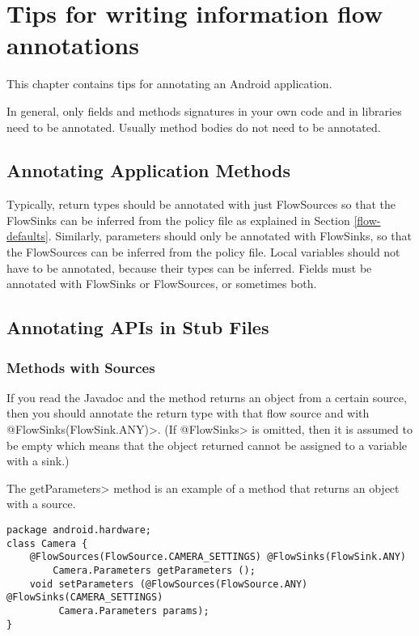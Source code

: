 \htmlhr
\chapter{Tips for writing information flow annotations\label{app-annotation}}

This chapter contains tips for annotating an Android application.

In general, only fields and methods signatures in your own code and in
libraries need to be annotated. Usually method bodies do not need to be
annotated.


\section{Annotating Application Methods\label{sec:annomethods}}

Typically, return types should be annotated with just FlowSources so that the FlowSinks can be
 inferred from the policy file as explained in Section \ref{flow-defaults}. Similarly, parameters should
  only be annotated with FlowSinks, so that the FlowSources can be inferred from  the policy file.
    Local variables should not have to be annotated, because their types can be inferred. Fields 
    must be annotated with  FlowSinks or FlowSources, or sometimes both. 

\section{Annotating APIs in Stub Files\label{sec:annoAPI}}

\subsection{Methods with Sources}
If you read the Javadoc and the method returns an object from a certain source, then you should annotate
the return type with that flow source and with \<@FlowSinks(FlowSink.ANY)>.  (If \<@FlowSinks> is omitted, then it is assumed to be empty
 which means that the object returned cannot be assigned to a variable with a sink.)

The \<getParameters> method is an example of a method that returns an object with a source.
\begin{Verbatim}
package android.hardware;
class Camera {
    @FlowSources(FlowSource.CAMERA_SETTINGS) @FlowSinks(FlowSink.ANY)
        Camera.Parameters getParameters ();
    void setParameters (@FlowSources(FlowSource.ANY) @FlowSinks(CAMERA_SETTINGS) 
         Camera.Parameters params);
}
\end{Verbatim}




